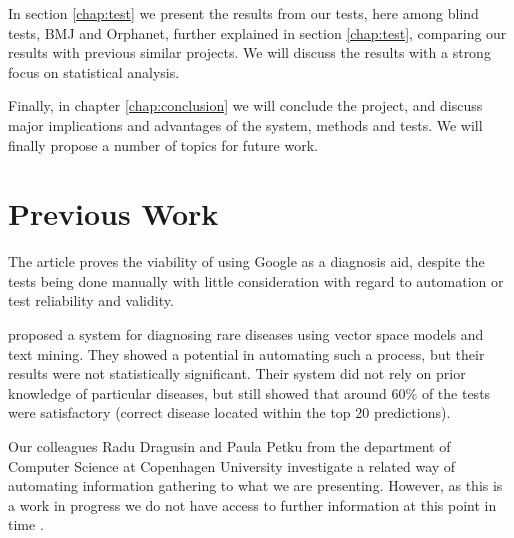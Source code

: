 \documentclass[10pt,letterpaper,final]{article}
\begin{document}

In section \ref{chap:test} we present the results from our tests, here
among blind tests, BMJ and Orphanet, further explained in section
\ref{chap:test}, comparing our results with previous similar projects.
We will discuss the results with a strong focus on statistical analysis.

Finally, in chapter \ref{chap:conclusion} we will conclude the project,
and discuss major implications and advantages of the system, methods and
tests. We will finally propose a number of topics for future work.



\section{Previous Work}
\label{chap:previouswork}
The article \cite{googlingdiagnosis} proves the viability of using
Google as a diagnosis aid, despite the tests being done manually with
little consideration with regard to automation or test reliability and
validity.

\cite{jensenandersen} proposed a system for diagnosing rare diseases
using vector space models and text mining. They showed a potential in
automating such a process, but their results were not statistically
significant. Their system did not rely on prior knowledge of particular
diseases, but still showed that around 60\% of the tests were
satisfactory (correct disease located within the top 20 predictions).

Our colleagues Radu Dragusin and Paula Petku from the department of
Computer Science at Copenhagen University investigate a related way of
automating information gathering to what we are presenting. However, as
this is a work in progress we do not have access to further information
at this point in time \cite{radupaula}.
\end{document}
